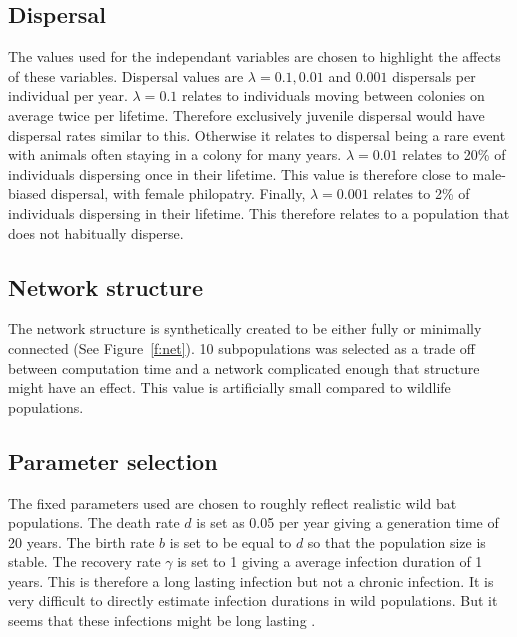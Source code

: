\subsection{Dispersal}

The values used for the independant variables are chosen to highlight the affects of these variables. 
Dispersal values are $\lambda = 0.1, 0.01$ and $ 0.001$ dispersals per individual per year. 
$\lambda = 0.1$ relates to individuals moving between colonies on average twice per lifetime. 
Therefore exclusively juvenile dispersal would have dispersal rates similar to this. 
Otherwise it relates to dispersal being a rare event with animals often staying in a colony for many years.
$\lambda = 0.01$ relates to 20\% of individuals dispersing once in their lifetime.
This value is therefore close to male-biased dispersal, with female philopatry. 
Finally, $\lambda = 0.001$ relates to 2\% of individuals dispersing in their lifetime.
This therefore relates to a population that does not habitually disperse.




\subsection{Network structure}
The network structure is synthetically created to be either fully or minimally connected (See Figure~\ref{f:net}). 
10 subpopulations was selected as a trade off between computation time and a network complicated enough that structure might have an effect. 
This value is artificially small compared to wildlife populations. 



\subsection{Parameter selection}


The fixed parameters used are chosen to roughly reflect realistic wild bat populations. 
The death rate $d$ is set as 0.05 per year giving a generation time of 20 years.
The birth rate $b$ is set to be equal to $d$ so that the population size is stable.
The recovery rate $\gamma$ is set to 1 giving a average infection duration of 1 years. 
This is therefore a long lasting infection but not a chronic infection. 
It is very difficult to directly estimate infection durations in wild populations.
But it seems that these infections might be long lasting \cite{}.

